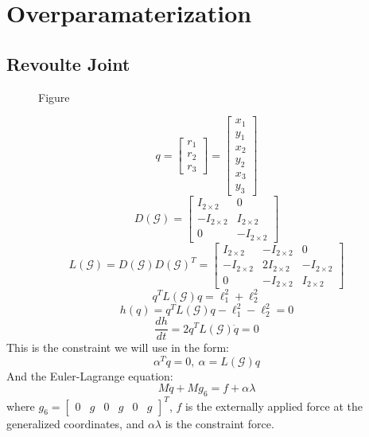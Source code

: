 \documentclass[conference]{IEEEtran}
\begin{document}
\section{Overparamaterization}
\subsection{Revoulte Joint}
\begin{figure}[htbp]
    \centering
    \caption{Figure}
    \label{fig:over}
\end{figure}

$$q = \begin{bmatrix}
    r_1\\r_2\\r_3
\end{bmatrix}=\begin{bmatrix}
    x_1\\y_1\\x_2\\y_2\\x_3\\y_3
\end{bmatrix}$$
$$D(\mathcal{G})=\begin{bmatrix}
    I_{2\times2} & 0\\ -I_{2\times2} & I_{2\times2}\\ 0 & -I_{2\times2}
\end{bmatrix}$$
$$L(\mathcal{G})=D(\mathcal{G})D(\mathcal{G})^T=\begin{bmatrix}
    I_{2\times2} & -I_{2\times2} & 0\\
    -I_{2\times2} & 2I_{2\times2} & -I_{2\times2}\\
    0 & -I_{2\times2} & I_{2\times2}
\end{bmatrix}$$
$$q^TL(\mathcal{G})q=\ell_1^2+\ell_2^2$$
$$h(q)=q^TL(\mathcal{G})q-\ell_1^2-\ell_2^2=0$$
$$\frac{dh}{dt}=2q^TL(\mathcal{G})\dot{q}=0$$
This is the constraint we will use in the form:
$$\alpha^T\dot{q}=0,\:\alpha=L(\mathcal{G})q$$
And the Euler-Lagrange equation:
$$M\ddot{q}+Mg_6=f+\alpha\lambda$$
where $g_6=\begin{bmatrix}
    0&g&0&g&0&g
\end{bmatrix}^T$, $f$ is the externally applied force at the generalized coordinates, and $\alpha\lambda$ is the constraint force.
\end{document}
